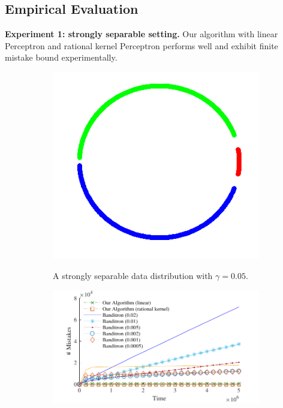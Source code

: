 \documentclass[landscape,a0a,final]{a0poster}
\begin{document}
\begin{multicols}{3}
\section*{Empirical Evaluation}
\begin{flushleft}
\textbf{Experiment 1: strongly separable setting.} Our algorithm with linear Perceptron
and rational kernel Perceptron performs well and exhibit finite mistake bound experimentally.
\end{flushleft}
\begin{figure}[H]
\centering
\begin{subfigure}[b]{0.08\textwidth}
\captionsetup{justification=centering}
\begin{center}
\includegraphics[width=\textwidth, trim={0, 0cm, 0, 0}, clip]{figures/strong_points}
\label{figure:strongly-separable-dataset}
\end{center}
\caption{A strongly separable data distribution with $\gamma = 0.05$.}
\end{subfigure}
\hfill
\begin{subfigure}[b]{0.20\textwidth}
  \includegraphics[width=\textwidth]{figures/strong3}

\end{subfigure}
\end{figure}
\end{multicols}
\end{document}
